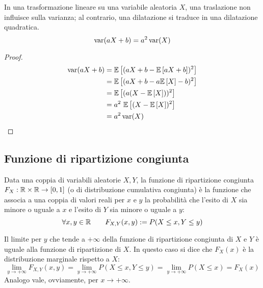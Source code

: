 \begin{prop}
	In una trasformazione lineare su una variabile aleatoria $X$, una traslazione non influisce sulla varianza; al contrario, una dilatazione si traduce in una dilatazione quadratica.
	\begin{equation*}
		\operatorname{var}(aX+b)=a^2\operatorname{var}(X)
	\end{equation*}
\end{prop}
\begin{proof}
	\begin{align*}
		\operatorname{var}(aX+b) & = \mathbb{E}\left[ (aX+b-\mathbb{E}\left[ aX+b \right])^2 \right] \\
		           & = \mathbb{E}\left[ (aX+b-a\mathbb{E}\left[ X \right]-b)^2 \right] \\
		           & = \mathbb{E}\left[ (a(X-\mathbb{E}\left[ X \right]))^2 \right]    \\
		           & = a^2~\mathbb{E}\left[ (X-\mathbb{E}\left[ X \right])^2 \right]   \\
		           & = a^2 \operatorname{var}(X)             \\
	\end{align*}
\end{proof}



\subsection{Funzione di ripartizione congiunta}
\begin{defin}
	Data una coppia di variabili aleatorie $X, Y$, la funzione di ripartizione congiunta $F_X:\mathbb R\times\mathbb R\to[0,1]$ (o di distribuzione cumulativa congiunta) è la funzione che associa a una coppia di valori reali per $x$ e $y$ la probabilità che l'esito di $X$ sia minore o uguale a $x$ e l'esito di $Y$ sia minore o uguale a $y$:
	\begin{equation*}
		\forall x,y\in\mathbb R\qquad F_{X,Y}(x,y):=P(X\leq x, Y\leq y) \\
	\end{equation*}
\end{defin}

Il limite per $y$ che tende a $+\infty$ della funzione di ripartizione congiunta di $X$ e $Y$ è uguale alla funzione di ripartizione di $X$. In questo caso si dice che $F_X(x)$ è la distribuzione marginale rispetto a $X$:
\begin{equation} \label{eq:distrmargin}
	\lim_{y\to+\infty}F_{X,Y}(x, y)=\lim_{y\to+\infty}P(X\leq x,Y\leq y)=\lim_{y\to+\infty}P(X\leq x)=F_X(x)
\end{equation}
Analogo vale, ovviamente, per $x\to+\infty$.



